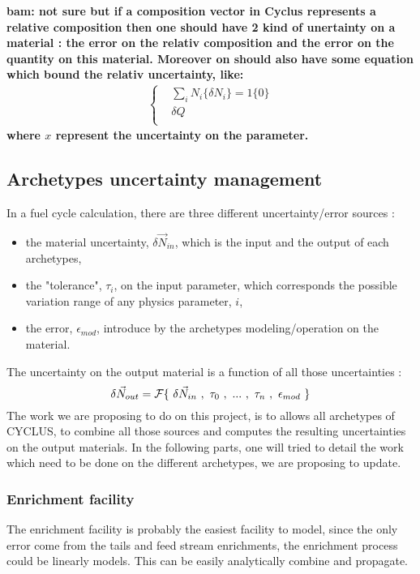 \documentclass[dvips,12pt]{article}
\newcommand{\comment}[1]
{{\bfseries \color{red} #1}}
\begin{document}
\comment{bam: not sure but if a composition vector
in Cyclus represents a relative composition then
one should have 2 kind of unertainty on a material
: the error on the relativ composition and the
error on the quantity on this material. Moreover
on should also have some equation which bound the
relativ uncertainty, like: \\
\begin{eqnarray}
\left\{
\begin{aligned}
&\sum_i N_i \{\delta N_i\} = 1 \{0\}\\
&\delta Q\\
\end{aligned}
\right.
\end{eqnarray}
where ${x}$ represent the uncertainty on the parameter.
}
\subsection{Archetypes uncertainty management}
In a fuel cycle calculation, there are three
different uncertainty/error sources :
\begin{itemize}
\item the material uncertainty,
  $\delta\vec{N}_{in}$, which is the input and the
  output of each archetypes,
\item the "tolerance", $\tau_{i}$, on the input
  parameter, which corresponds the possible
  variation range of any physics parameter, $i$,
\item the error, $\epsilon_{mod}$, introduce by
  the archetypes modeling/operation on the
  material.
\end{itemize}
The uncertainty on the output material is a
function of all those uncertainties :
\begin{equation}
\delta \vec{N}_{out} = {\cal F}\{~\delta\vec{N}_{in}~,~\tau_0~,~...~,~\tau_n~,~\epsilon_{mod}~\}
\end{equation}
The work we are proposing to do on this project,
is to allows all archetypes of CYCLUS, to combine
all those sources and computes the resulting
uncertainties on the output materials.  In the
following parts, one will tried to detail the work
which need to be done on the different archetypes,
we are proposing to update.
\subsubsection{Enrichment facility}
The enrichment facility is probably the easiest
facility to model, since the only error come from
the tails and feed stream enrichments, the
enrichment process could be linearly models. This
can be easily analytically combine and propagate.
\end{document}
